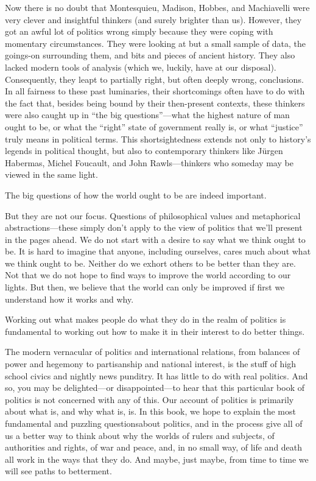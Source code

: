 \documentclass[10pt]{article}
\begin{document}
{\large Now there is no doubt that Montesquieu, Madison, Hobbes, and Machiavelli
were very clever and insightful thinkers (and surely brighter than us). However,
they got an awful lot of politics wrong simply because they were coping with
momentary circumstances. They were looking at but a small sample of data, the
goings-on surrounding them, and bits and pieces of ancient history. They also
lacked modern tools of analysis (which we, luckily, have at our disposal).
Consequently, they leapt to partially right, but often deeply wrong, conclusions.
In all fairness to these past luminaries, their shortcomings often have to do
with the fact that, besides being bound by their then-present contexts, these
thinkers were also caught up in ``the big questions''---what the highest nature
of man ought to be, or what the ``right'' state of government really is, or what
``justice'' truly means in political terms. This shortsightedness extends not
only to history's legends in political thought, but also to contemporary thinkers
like J\"{u}rgen Habermas, Michel Foucault, and John Rawls---thinkers who someday
may be viewed in the same light.}

{\large The big questions of how the world ought to be are indeed important.}

{\large But they are not our focus. Questions of philosophical values and
metaphorical abstractions---these simply don't apply to the view of politics that
we'll present in the pages ahead. We do not start with a desire to say what we
think ought to be. It is hard to imagine that anyone, including ourselves, cares
much about what we think ought to be. Neither do we exhort others to be better
than they are. Not that we do not hope to find ways to improve the world
according to our lights. But then, we believe that the world can only be improved
if first we understand how it works and why.}

{\large Working out what makes people do what they do in the realm of politics
is fundamental to working out how to make it in their interest to do better
things.}

{\large The modern vernacular of politics and international relations, from
balances of power and hegemony to partisanship and national interest, is the
stuff of high school civics and nightly news punditry. It has little to do with
real politics. And so, you may be delighted---or disappointed---to hear that this
particular book of politics is not concerned with any of this. Our account of
politics is primarily about what is, and why what is, is. In this book, we hope
to explain the most fundamental and puzzling questionsabout politics, and in the
process give all of us a better way to think about why the worlds of rulers and
subjects, of authorities and rights, of war and peace, and, in no small way, of
life and death all work in the ways that they do. And maybe, just maybe, from
time to time we will see paths to betterment.}
\end{document}

